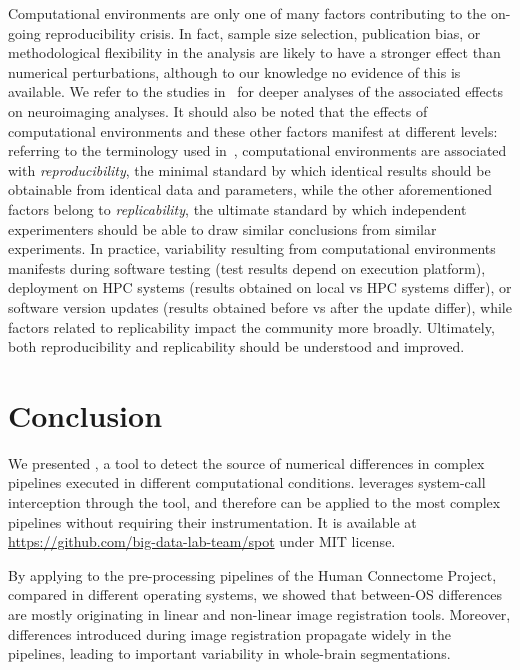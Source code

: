 Computational environments are only one of many factors contributing to the
on-going reproducibility crisis. In fact, sample size selection,
publication bias, or methodological flexibility in the analysis are likely
to have a stronger effect than numerical perturbations, although
to our knowledge no evidence of this is available. We refer to the
studies in~\cite{botvinik2020variability,bowring2019exploring,bhagwat2020understanding,kennedy2019everything} for deeper
analyses of the associated effects on neuroimaging analyses. It should also be
noted that the effects of computational environments and these other
factors manifest at different levels: referring to the terminology used
in~\cite{peng2011reproducible}, computational environments are associated with
\emph{reproducibility}, the minimal standard by which identical results
should be obtainable from identical data and parameters, while the other
aforementioned factors belong to \emph{replicability}, the ultimate
standard by which independent experimenters should be able to draw similar
conclusions from similar experiments. In practice, variability resulting
from computational environments manifests during software testing (test
results depend on execution platform), deployment on HPC systems (results
obtained on local vs HPC systems differ), or software version updates
(results obtained before vs after the update differ), while factors related
to replicability impact the community more broadly. Ultimately, both
reproducibility and replicability should be understood and improved.


\section{Conclusion}

We presented \toolname, a tool to detect the source of numerical
differences in complex pipelines executed in different computational
conditions. \toolname leverages system-call interception through the
\reprozip tool, and therefore can be applied to the most complex pipelines
without requiring their instrumentation. It is available at
\url{https://github.com/big-data-lab-team/spot} under MIT license.

By applying \toolname to the pre-processing pipelines of the Human
Connectome Project, compared in different operating systems, we showed that
between-OS differences are mostly originating in linear and non-linear
image registration tools. Moreover, differences introduced during image
registration propagate widely in the pipelines, leading to important
variability in whole-brain segmentations.

